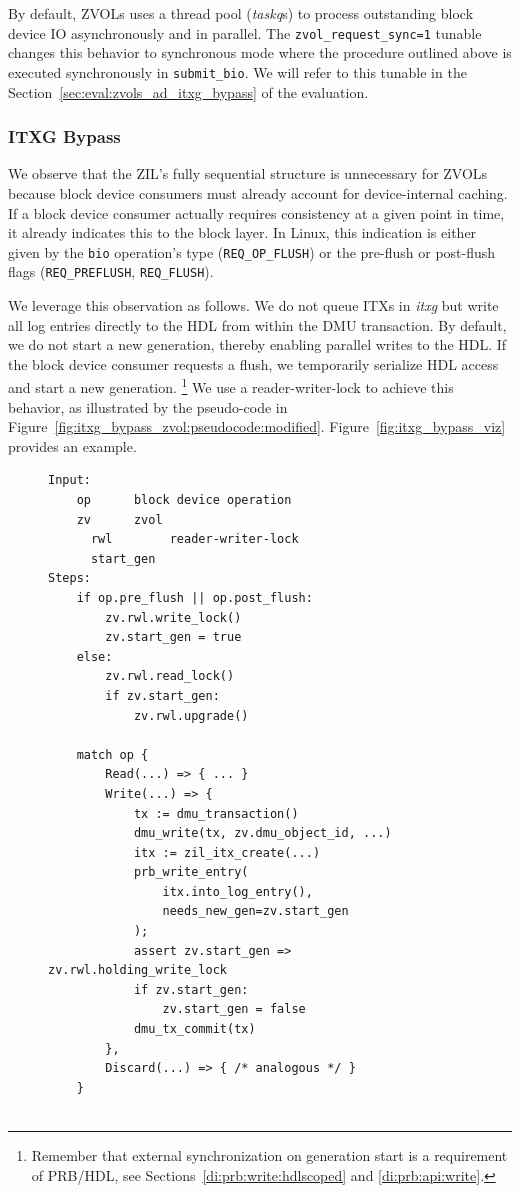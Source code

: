 \documentclass[12pt,a4paper,twoside]{book}
\begin{document}
{By default, ZVOLs uses a thread pool (\textit{taskq}s) to process outstanding block device IO asynchronously and in parallel.
The \lstinline{zvol_request_sync=1} tunable changes this behavior to synchronous mode where the procedure outlined above is executed synchronously in \lstinline{submit_bio}.
We will refer to this tunable in the Section~\ref{sec:eval:zvols_ad_itxg_bypass} of the evaluation.

\subsubsection{ITXG Bypass}

We observe that the ZIL's fully sequential structure is unnecessary for ZVOLs because block device consumers must already account for device-internal caching.
If a block device consumer actually requires consistency at a given point in time, it already \underline{} indicates this to the block layer.
In Linux, this indication is either given by the \lstinline{bio} operation's type (\lstinline{REQ_OP_FLUSH}) or the pre-flush or post-flush flags (\lstinline{REQ_PREFLUSH}, \lstinline{REQ_FLUSH}).

We leverage this observation as follows.
We do not queue ITXs in \textit{itxg} but write all log entries directly to the HDL from within the DMU transaction.
By default, we do not start a new generation, thereby enabling parallel writes to the HDL.
If the block device consumer requests a flush, we temporarily serialize HDL access and start a new generation.%
\footnote{Remember that external synchronization on generation start is a requirement of PRB/HDL, see Sections~\ref{di:prb:write:hdlscoped} and \ref{di:prb:api:write}.}
We use a reader-writer-lock to achieve this behavior, as illustrated by the pseudo-code in Figure~\ref{fig:itxg_bypass_zvol:pseudocode:modified}.
Figure~\ref{fig:itxg_bypass_viz} provides an example.

\begin{figure}[H]
\begin{lstlisting}[style=figurepseudocode]
Input:
    op      block device operation
    zv      zvol
      rwl        reader-writer-lock
      start_gen
Steps:
    if op.pre_flush || op.post_flush:
        zv.rwl.write_lock()
        zv.start_gen = true
    else:
        zv.rwl.read_lock()
        if zv.start_gen:
            zv.rwl.upgrade()

    match op {
        Read(...) => { ... }
        Write(...) => {
            tx := dmu_transaction()
            dmu_write(tx, zv.dmu_object_id, ...)
            itx := zil_itx_create(...)
            prb_write_entry(
                itx.into_log_entry(),
                needs_new_gen=zv.start_gen
            );
            assert zv.start_gen => zv.rwl.holding_write_lock
            if zv.start_gen:
                zv.start_gen = false
            dmu_tx_commit(tx)
        },
        Discard(...) => { /* analogous */ }
    }


\end{lstlisting}
\end{figure}}
\end{document}
